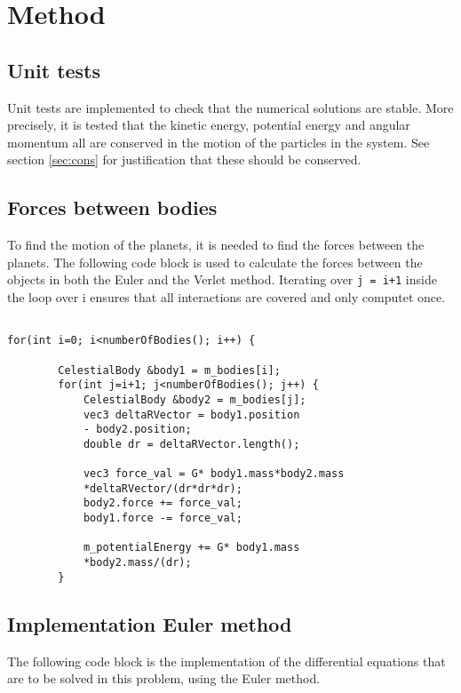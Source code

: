 \section{Method}

\subsection{Unit tests}
Unit tests are implemented to check that the numerical solutions are stable. More precisely, it is tested that the kinetic energy, potential energy and angular momentum all are conserved in the motion of the particles in the system. See section \ref{sec:cons} for justification that these should be conserved. 

\subsection{Forces between bodies}
To find the motion of the planets, it is needed to find the forces between the planets. The following code block is used to calculate the forces between the objects in both the Euler and the Verlet method. Iterating over \lstinline{j = i+1} inside the loop over i ensures that all interactions are covered and only computet once. 
\begin{lstlisting}[frame=single]
  
for(int i=0; i<numberOfBodies(); i++) {

        CelestialBody &body1 = m_bodies[i];
        for(int j=i+1; j<numberOfBodies(); j++) {
            CelestialBody &body2 = m_bodies[j];
            vec3 deltaRVector = body1.position 
            - body2.position;
            double dr = deltaRVector.length();

            vec3 force_val = G* body1.mass*body2.mass
            *deltaRVector/(dr*dr*dr);
            body2.force += force_val;
            body1.force -= force_val;

            m_potentialEnergy += G* body1.mass
            *body2.mass/(dr);
        }
\end{lstlisting}

\subsection{Implementation Euler method}
The following code block is the implementation of the differential equations that are to be solved in this problem, using the Euler method. 

